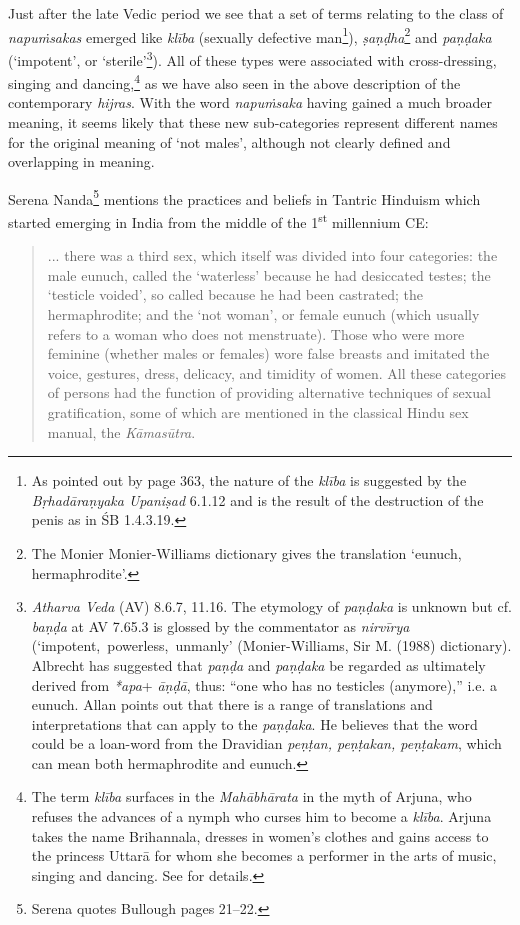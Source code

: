 Just after the late Vedic period we see that a set of terms relating to the class of \textit{napuṁsakas} emerged like \textit{klība} (sexually defective man\footnote{As pointed out by \cite{zwilling} page 363, the nature of the \textit{klība} is suggested by the \textit{Bṛhadāraṇyaka Upaniṣad} 6.1.12 and is the result of the destruction of the penis as in ŚB 1.4.3.19.}), \textit{ṣaṇḍha}\footnote{The Monier Monier-Williams dictionary gives the translation `eunuch, hermaphrodite'.} and \textit{paṇḍaka} (`impotent', or `sterile'\footnote{\textit{Atharva Veda} (AV) 8.6.7, 11.16. The etymology of \textit{paṇḍaka} is unknown but cf. \textit{baṇḍa} at AV 7.65.3 is glossed by the commentator as \textit{nirvīrya} (`impotent, powerless, unmanly' (Monier-Williams, Sir M. (1988) dictionary). Albrecht \cite{wezler} has suggested that \textit{paṇḍa} and \textit{paṇḍaka} be regarded as ultimately derived from \textit{*apa}+ \textit{āṇḍā}, thus: ``one who has no testicles (anymore),'' i.e. a eunuch. Allan \cite{bomhard} points out that there is a range of translations and interpretations that can apply to the \textit{paṇḍaka}. He believes that the word could be a loan-word from the Dravidian \textit{peṇṭan, peṇṭakan, peṇṭakam}, which can mean both hermaphrodite and eunuch.}). All of these types were associated with cross-dressing, singing and dancing,\footnote{The term \textit{klība} surfaces in the \textit{Mahābhārata} in the myth of Arjuna, who refuses the advances of a nymph who curses him to become a \textit{klība}. Arjuna takes the name Brihannala, dresses in women's clothes and gains access to the princess Uttarā for whom she becomes a performer in the arts of music, singing and dancing. See \cite{cassell} for details.} as we have also seen in the above description of the contemporary \textit{hijras}. With the word \textit{napuṁsaka} having gained a much broader meaning, it seems likely that these new sub-categories represent different names for the original meaning of `not males', although not clearly defined and overlapping in meaning.

Serena Nanda\footnote{Serena \cite{nanda} quotes Bullough pages 21–22.} mentions the practices and beliefs in Tantric Hinduism which started emerging in India from the middle of the 1\textsuperscript{st} millennium CE:

\begin{quote}
... there was a third sex, which itself was divided into four categories: the male eunuch, called the `waterless' because he had desiccated testes; the `testicle voided', so called because he had been castrated; the hermaphrodite; and the `not woman', or female eunuch (which usually refers to a woman who does not menstruate). Those who were more feminine (whether males or females) wore false breasts and imitated the voice, gestures, dress, delicacy, and timidity of women. All these categories of persons had the function of providing alternative techniques of sexual gratification, some of which are mentioned in the classical Hindu sex manual, the \textit{Kāmasūtra}.
\end{quote}

